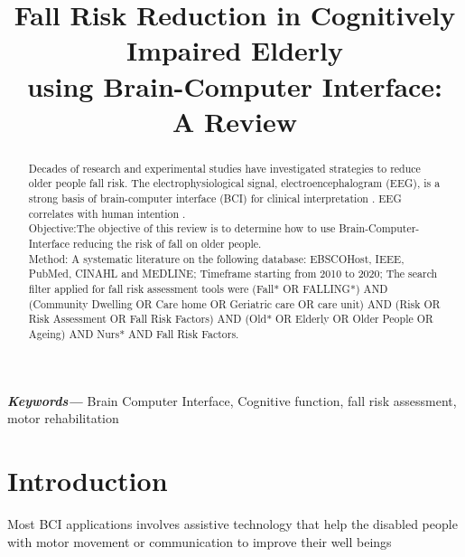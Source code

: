 \documentclass[conference,compsoc]{IEEEtran}
\providecommand{\keywords}[1]
{
  \small	
  \textbf{\textit{Keywords---}} #1
}
\begin{document}
\title{Fall Risk Reduction in Cognitively Impaired Elderly \\using Brain-Computer Interface: \\A Review}


\author{
}


\maketitle

\begin{abstract}
Decades of research and experimental studies have investigated strategies to reduce older people fall risk. The electrophysiological signal, electroencephalogram
(EEG),  is a strong basis of brain-computer interface (BCI) for clinical interpretation \cite{Panoulas_2010,Mane_2020}. EEG correlates with human intention \cite{Panoulas_2010}.\\
Objective:The objective of this review is to determine how to use Brain-Computer-Interface 
reducing the risk of fall on older people.\\
Method: A systematic literature on the following database: EBSCOHost, IEEE, PubMed, CINAHL and MEDLINE; 
Timeframe starting from 2010 to 2020;
The search filter applied for fall risk assessment tools
were (Fall* 
	OR FALLING*)
AND (Community Dwelling
	OR Care home
	OR Geriatric care OR care unit)
AND (Risk
	OR Risk Assessment
	OR Fall Risk Factors)
AND (Old*
	OR Elderly
	OR Older People
	OR Ageing)
AND Nurs*
AND Fall Risk Factors.
\end{abstract}

\keywords{Brain Computer Interface, Cognitive function, fall risk assessment, motor rehabilitation}

\IEEEpeerreviewmaketitle


\section{Introduction}
Most BCI applications involves assistive technology that help the disabled people with motor movement or communication to improve their well beings\cite{Kubler_2006}
\end{document}
